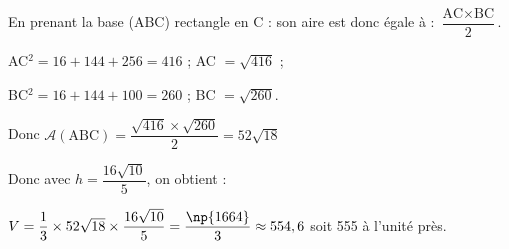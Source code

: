 \begin{enumerate}
%
En prenant la base (ABC) rectangle en C : son aire est donc égale à :
$\dfrac{\text{AC} \times \text{BC}}{2}$.

AC$^2 = 16 + 144  + 256 = 416$ ; AC $ = \sqrt{416}$ ;

BC$^2 = 16 + 144 + 100 = 260$ ; BC $ = \sqrt{260}$.

Donc $\mathcal{A}(\text{ABC}) = \dfrac{\sqrt{416} \times \sqrt{260}}{2} = 52\sqrt{18}$

Donc avec $h = \dfrac{16 \sqrt{10}}{5}$, on obtient :

$V = \dfrac13 \times 52\sqrt{18} \times \dfrac{16 \sqrt{10}}{5} = \dfrac{\np{1664}}{3} \approx 554,6$ soit 555 à l'unité près.
\end{enumerate}

\bigskip

